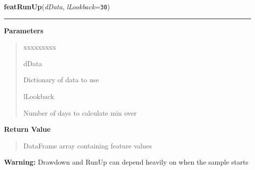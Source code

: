 \hspace{.8\funcindent}\begin{boxedminipage}{\funcwidth}

    \raggedright \textbf{featRunUp}(\textit{dData}, \textit{lLookback}={\tt 30})

    \vspace{-1.5ex}

    \rule{\textwidth}{0.5\fboxrule}
\setlength{\parskip}{2ex}
\setlength{\parskip}{1ex}
      \textbf{Parameters}
      \vspace{-1ex}

      \begin{quote}
        \begin{Ventry}{xxxxxxxxx}

          \item[dData]

          Dictionary of data to use

          \item[lLookback]

          Number of days to calculate min over

        \end{Ventry}

      \end{quote}

      \textbf{Return Value}
    \vspace{-1ex}

      \begin{quote}
      DataFrame array containing feature values

      \end{quote}

\textbf{Warning:} Drawdown and RunUp can depend heavily on when the sample starts



    \end{boxedminipage}

    \label{QSTK:qstkfeat:features:featVolumeDelta}

    \vspace{0.5ex}

